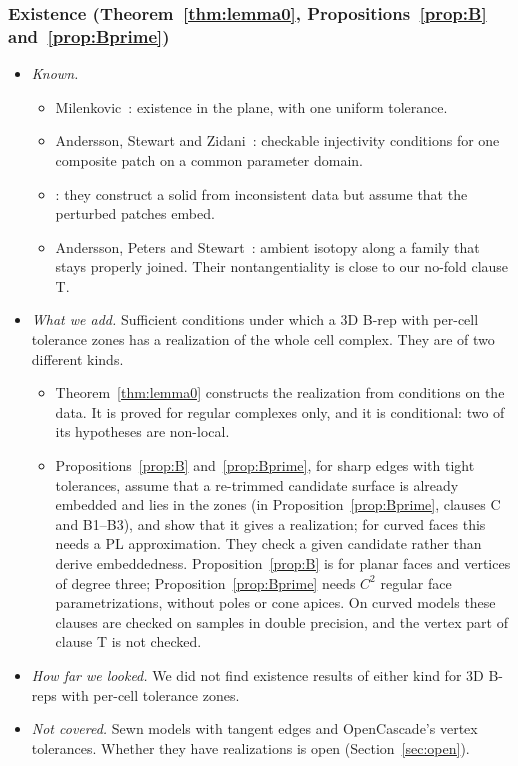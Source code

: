 \documentclass[preprint,12pt]{elsarticle}
\theoremstyle{definition}
\theoremstyle{remark}
\begin{document}
\subsubsection*{Existence (Theorem~\ref{thm:lemma0}, Propositions~\ref{prop:B} and~\ref{prop:Bprime})}
\begin{itemize}
\item \emph{Known.}
  \begin{itemize}
  \item Milenkovic~\cite{Milenkovic88}: existence in the plane, with one uniform tolerance.
  \item Andersson, Stewart and Zidani~\cite{ASZ06}: checkable injectivity conditions for one composite patch on a common
  parameter domain.
  \item \cite{ASZ07,SZ08}: they construct a solid from inconsistent data but assume that the perturbed patches embed.
  \item Andersson, Peters and Stewart~\cite[Thm.~1]{APS00}: ambient isotopy along a family that stays properly joined.
  Their nontangentiality is close to our no-fold clause T.
  \end{itemize}
\item \emph{What we add.} Sufficient conditions under which a 3D B-rep with per-cell tolerance zones has a realization
of the whole cell complex. They are of two different kinds.
  \begin{itemize}
  \item Theorem~\ref{thm:lemma0} constructs the realization from conditions on the data. It is proved for regular
  complexes only, and it is conditional: two of its hypotheses are non-local.
  \item Propositions~\ref{prop:B} and~\ref{prop:Bprime}, for sharp edges with tight tolerances, assume that a
  re-trimmed candidate surface is already embedded and lies in the zones (in Proposition~\ref{prop:Bprime}, clauses C
  and B1--B3), and show that it gives a realization; for curved faces this needs a PL approximation. They check a given
  candidate rather than derive embeddedness. Proposition~\ref{prop:B} is for planar faces and vertices of degree three;
  Proposition~\ref{prop:Bprime} needs $C^2$ regular face parametrizations, without poles or cone apices. On curved models these clauses are
  checked on samples in double precision, and the vertex part of clause T is not checked.
  \end{itemize}
\item \emph{How far we looked.} We did not find existence results of either kind for 3D B-reps with per-cell
tolerance zones.
\item \emph{Not covered.} Sewn models with tangent edges and OpenCascade's vertex tolerances. Whether they have
realizations is open (Section~\ref{sec:open}).
\end{itemize}
\end{document}
